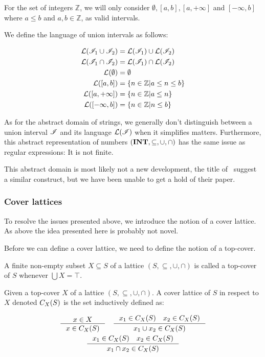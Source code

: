 For the set of integers $\mathbb{Z}$, we will only consider $\emptyset, [a, b], [a, +\infty]$ and $[-\infty, b]$ where $a \leq b$ and $a, b \in \mathbb{Z}$, as valid intervals.

We define the language of union intervals as follows:


\begin{align*}
    \mathcal{L}(\mathscr{I}_1 \cup \mathscr{I}_2) &= \mathcal{L}(\mathscr{I}_1) \cup \mathcal{L}(\mathscr{I}_2) \\
    \mathcal{L}(\mathscr{I}_1 \cap \mathscr{I}_2) &= \mathcal{L}(\mathscr{I}_1) \cap \mathcal{L}(\mathscr{I}_2) \\
    \mathcal{L}(\emptyset) &= \emptyset \\
    \mathcal{L}([a, b]) &= \left\{ n \in \mathbb{Z} \middle| a \leq n \leq b \right\} \\
    \mathcal{L}([a, +\infty]) &= \left\{ n \in \mathbb{Z} \middle| a \leq n \right\} \\
    \mathcal{L}([-\infty, b]) &= \left\{ n \in \mathbb{Z} \middle| n \leq b \right\}
\end{align*}


As for the abstract domain of strings, we generally don't distinguish between a union interval $\mathscr{I}$ and its language $\mathcal{L}(\mathscr{I})$ when it simplifies matters.
Furthermore, this abstract representation of numbers $(\mathbf{INT}, \subseteq, \cup, \cap)$ has the same issue as regular expressions: It is not finite.

This abstract domain is most likely not a new development, the title of~\cite{li2010abstract} suggest a similar construct, but we have been unable to get a hold of their paper.

\subsubsection{Cover lattices}\label{subsubsec:cover-lattice}
To resolve the issues presented above, we introduce the notion of a cover lattice.
As above the idea presented here is probably not novel.

Before we can define a cover lattice, we need to define the notion of a top-cover.

\begin{definition}
    A finite non-empty subset $X \subseteq S$ of a lattice $(S, \subseteq, \cup, \cap)$ is called a top-cover of $S$ whenever $\bigcup X = \top$.
\end{definition}

\begin{definition}\label{def:coverlattice}
Given a top-cover $X$ of a lattice $(S, \subseteq, \cup, \cap)$.
A cover lattice of $S$ in respect to $X$ denoted $C_{X}(S)$ is the set inductively defined as:

\begin{gather*}
    \inference{x \in X}{x \in C_X(S)} \quad
    \inference{x_1 \in C_X(S) \quad x_2 \in C_X(S)}{x_1 \cup  x_2 \in C_X(S)}\\
    \inference{x_1 \in C_X(S) \quad x_2 \in C_X(S)}{x_1 \cap  x_2 \in C_X(S)}
\end{gather*}
\end{definition}

